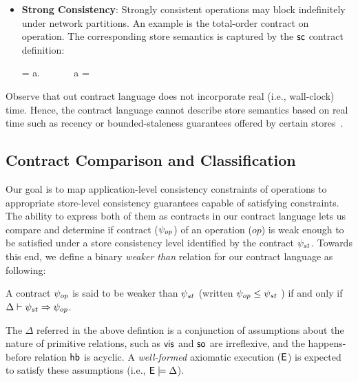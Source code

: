 \begin{itemize}
\item \textbf{Strong Consistency}: Strongly consistent operations may block
  indefinitely under network partitions. An example is the total-order
  contract on  operation. The corresponding store semantics is
  captured by the ${\sf sc}$ contract definition:

  \vspace{-1em}
  \begin{smathpar}
  \scc = \forall a.~ \Rightarrow {} ~\vee~  ~\vee~ a = \cureff
  \end{smathpar}

\end{itemize}

Observe that out contract language does not incorporate real (i.e.,
wall-clock) time. Hence, the contract language cannot describe store
semantics based on real time such as recency or bounded-staleness
guarantees offered by certain stores~\cite{Pileus}.




\subsection{Contract Comparison and Classification}

Our goal is to map application-level consistency constraints of
operations to appropriate store-level consistency guarantees capable
of satisfying constraints.  The ability to express both of them as
contracts in our contract language lets us compare and determine if
contract ($\psi_{op}$) of an operation ($op$) is weak enough to be
satisfied under a store consistency level identified by the contract
$\psi_{st}$. Towards this end, we define a binary \emph{weaker than}
relation for our contract language as following:

\begin{definition}
A contract $\psi_{op}$ is said to be weaker than $\psi_{st}$ (written $\psi_{op}
\le \psi_{st}$ ) if and only if $\Delta \vdash \psi_{st} \Rightarrow \psi_{op}$.
\begin{center}
\end{center}
\end{definition}

\vspace{-1em}
\noindent The $\Delta$ referred in the above defintion is a
conjunction of assumptions about the nature of primitive relations,
such as ${\normalfont \textsf{vis}}$ and ${\normalfont \textsf{so}}$ are irreflexive, and the happens-before
relation ${\normalfont \textsf{hb}}$ is acyclic. A \emph{well-formed} axiomatic execution
(${\normalfont \textsf{E}}$) is expected to satisfy these assumptions (i.e., ${\normalfont \textsf{E}} \models
\Delta$).


